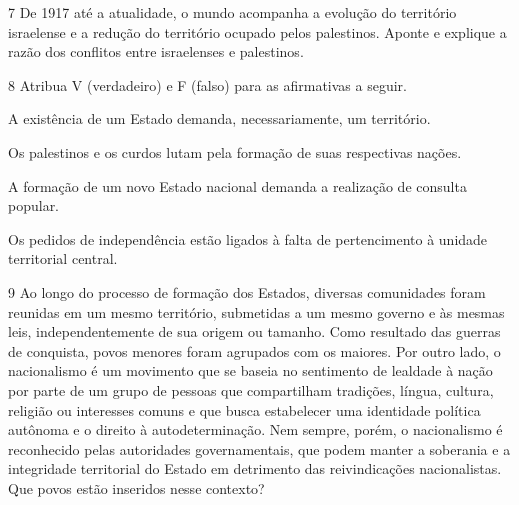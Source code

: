 
\num{7} De 1917 até a atualidade, o mundo acompanha a evolução do
território israelense e a redução do território ocupado pelos
palestinos. Aponte e explique a razão dos conflitos entre israelenses e
palestinos.


\num{8} Atribua V (verdadeiro) e F (falso) para as afirmativas a seguir.

\begin{boxlist}
 A existência de um Estado demanda, necessariamente, um território.

 Os palestinos e os curdos lutam pela formação de suas respectivas
nações.

 A formação de um novo Estado nacional demanda a realização de
consulta popular.

 Os pedidos de independência estão ligados à falta de pertencimento à
unidade territorial central.
\end{boxlist}

\num{9} Ao longo do processo de formação dos Estados, diversas
comunidades foram reunidas em um mesmo território, submetidas a um mesmo
governo e às mesmas leis, independentemente de sua origem ou tamanho.
Como resultado das guerras de conquista, povos menores foram agrupados
com os maiores. Por outro lado, o nacionalismo é um movimento que se
baseia no sentimento de lealdade à nação por parte de um grupo de
pessoas que compartilham tradições, língua, cultura, religião ou
interesses comuns e que busca estabelecer uma identidade política
autônoma e o direito à autodeterminação. Nem sempre, porém, o
nacionalismo é reconhecido pelas autoridades governamentais, que podem
manter a soberania e a integridade territorial do Estado em detrimento
das reivindicações nacionalistas. Que povos estão inseridos nesse
contexto?


